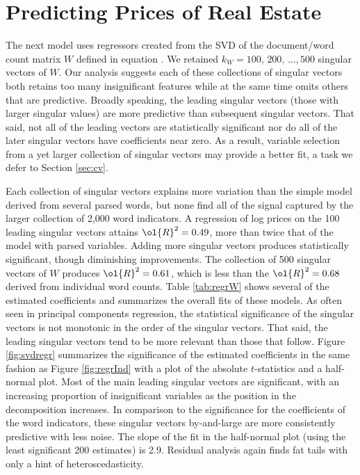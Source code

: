 \documentclass[10pt]{article}
\begin{document}
\section{Predicting Prices of Real Estate}


 The next model uses regressors created from the SVD of the document/word
 count matrix $W$ defined in equation .  We retained $k_W = 100,\, 200, \, \ldots, 500$ singular vectors of $W$.   Our analysis suggests each of these collections of singular vectors both retains too many insignificant features while at the same time omits others that are predictive.  Broadly speaking, the leading singular vectors (those with larger singular values) are more predictive than subsequent singular vectors.  That said, not all of the leading vectors are statistically significant nor do all of the later singular vectors have coefficients near zero.   As a result, variable selection from a yet larger collection of singular vectors may provide a better fit, a task we defer to Section \ref{sec:cv}.  
 

Each collection of singular vectors explains more variation than the simple model derived from several parsed words, but none find all of the signal captured by the larger collection of 2,000 word indicators.  A regression of log prices on the 100 leading singular vectors attains $\ol{R}^2 = 0.49$, more than twice that of the model with parsed variables.  Adding more singular vectors produces statistically significant, though diminishing improvements.  The collection of 500 singular vectors of $W$ produces $\ol{R}^2 = 0.61$, which is less than the $\ol{R}^2 = 0.68$ derived from individual word counts.  Table \ref{tab:regrW}  shows several of the estimated coefficients and summarizes the overall fits of these models.  As often seen in principal components regression, the statistical significance of the singular vectors is not monotonic in the order of the singular vectors. That said, the leading singular vectors tend to be more relevant than those that follow. Figure \ref{fig:svdregr} summarizes the significance of the estimated coefficients in the same fashion as Figure \ref{fig:regrInd} with a plot of the absolute $t$-statistics and a half-normal plot. Most of the main leading singular vectors are significant, with an increasing proportion of insignificant variables as the position in the decomposition increases.  In comparison to the significance for the coefficients of the word indicators, these singular vectors by-and-large are more consistently predictive with less noise.  The slope of the fit in the half-normal plot (using the least significant 200 estimates) is 2.9.  Residual analysis again finds fat tails with only a hint of heteroscedasticity.
 
\end{document}
